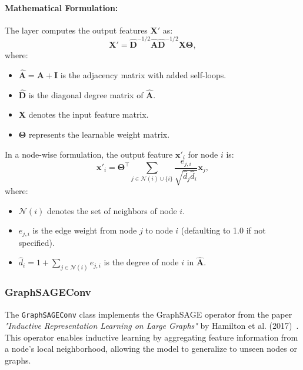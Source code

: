 \documentclass{article}
\begin{document}
\paragraph{Mathematical Formulation:}
The layer computes the output features $\mathbf{X}'$ as:
\begin{equation}
\mathbf{X}' = \mathbf{\hat{D}}^{-1/2} \mathbf{\hat{A}} \mathbf{\hat{D}}^{-1/2} \mathbf{X} \mathbf{\Theta},
\end{equation}
where:
\begin{itemize}
    \item $\mathbf{\hat{A}} = \mathbf{A} + \mathbf{I}$ is the adjacency matrix with added self-loops.
    \item $\mathbf{\hat{D}}$ is the diagonal degree matrix of $\mathbf{\hat{A}}$.
    \item $\mathbf{X}$ denotes the input feature matrix.
    \item $\mathbf{\Theta}$ represents the learnable weight matrix.
\end{itemize}

In a node-wise formulation, the output feature $\mathbf{x}'_i$ for node $i$ is:
\begin{equation}
\mathbf{x}'_i = \mathbf{\Theta}^{\top} \sum_{j \in \mathcal{N}(i) \cup \{ i \}} \frac{e_{j,i}}{\sqrt{\hat{d}_j \hat{d}_i}} \mathbf{x}_j,
\end{equation}
where:
\begin{itemize}
    \item $\mathcal{N}(i)$ denotes the set of neighbors of node $i$.
    \item $e_{j,i}$ is the edge weight from node $j$ to node $i$ (defaulting to 1.0 if not specified).
    \item $\hat{d}_i = 1 + \sum_{j \in \mathcal{N}(i)} e_{j,i}$ is the degree of node $i$ in $\mathbf{\hat{A}}$.
\end{itemize}

\subsubsection{GraphSAGEConv}
The \texttt{GraphSAGEConv} class implements the GraphSAGE operator from the paper \emph{"Inductive Representation Learning on Large Graphs"} by Hamilton et al. (2017)~\cite{hamilton2018inductiverepresentationlearninglarge}. This operator enables inductive learning by aggregating feature information from a node's local neighborhood, allowing the model to generalize to unseen nodes or graphs.
\end{document}
